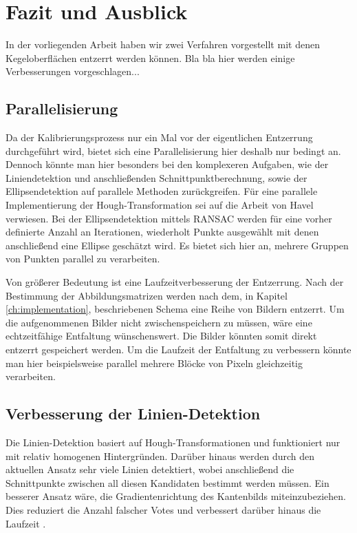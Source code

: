 \chapter{Fazit und Ausblick}
\label{ch:summary}

In der vorliegenden Arbeit haben wir zwei Verfahren vorgestellt mit denen Kegeloberflächen entzerrt werden können.
Bla bla hier werden einige Verbesserungen vorgeschlagen...

\section{Parallelisierung}
Da der Kalibrierungsprozess nur ein Mal vor der eigentlichen Entzerrung durchgeführt wird, bietet sich eine Parallelisierung hier deshalb nur bedingt an.
Dennoch könnte man hier besonders bei den komplexeren Aufgaben, wie der Liniendetektion und anschließenden Schnittpunktberechnung, sowie der Ellipsendetektion auf parallele Methoden zurückgreifen.
Für eine parallele Implementierung der Hough-Transformation sei auf die Arbeit von Havel \cite{Havel2014} verwiesen.
Bei der Ellipsendetektion mittels RANSAC werden für eine vorher definierte Anzahl an Iterationen, wiederholt Punkte ausgewählt mit denen anschließend eine Ellipse geschätzt wird. Es bietet sich hier an, mehrere Gruppen von Punkten parallel zu verarbeiten.

Von größerer Bedeutung ist eine Laufzeitverbesserung der Entzerrung. Nach der Bestimmung der Abbildungsmatrizen werden nach dem, in Kapitel \ref{ch:implementation}, beschriebenen Schema eine Reihe von Bildern entzerrt. Um die aufgenommenen Bilder nicht zwischenspeichern zu müssen, wäre eine echtzeitfähige Entfaltung wünschenswert. Die Bilder könnten somit direkt entzerrt gespeichert werden.  Um die Laufzeit der Entfaltung zu verbessern könnte man hier beispielsweise parallel mehrere Blöcke von Pixeln gleichzeitig verarbeiten.


\section{Verbesserung der Linien-Detektion}
Die Linien-Detektion basiert auf Hough-Transformationen und funktioniert nur mit relativ homogenen Hintergründen. Darüber hinaus werden durch den aktuellen Ansatz sehr viele Linien detektiert, wobei anschließend die Schnittpunkte zwischen all diesen Kandidaten bestimmt werden müssen. Ein besserer Ansatz wäre, die Gradientenrichtung des Kantenbilds miteinzubeziehen. Dies reduziert die Anzahl falscher Votes und verbessert darüber hinaus die Laufzeit \cite{Gorman1976}.


